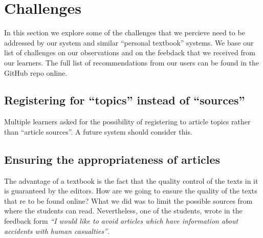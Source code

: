 \newpage
\section{Challenges}
\label{sec:challenges}

In this section we explore some of the challenges that we percieve need to be addressed by our system and similar ``personal textbook'' systems. We base our list of challenges on our observations and on the feebdack that we received from our learners. The full list of recommendations from our users can be found in the GitHub repo online.

\subsection{Registering for ``topics'' instead of ``sources''}
Multiple learners asked for the possibility of registering to article topics rather than ``article sources''. A future system should consider this.

\subsection{Ensuring the appropriateness of articles}
The advantage of a textbook is the fact that the quality control of the texts in it is guaranteed by the editors. How are we going to ensure the quality of the texts that re to be found online? What we did was to limit the possible sources from where the students can read. Nevertheless, one of the students, wrote in the feedback form {\em ``I would like to avoid articles which have information about accidents with human casualties''}.




